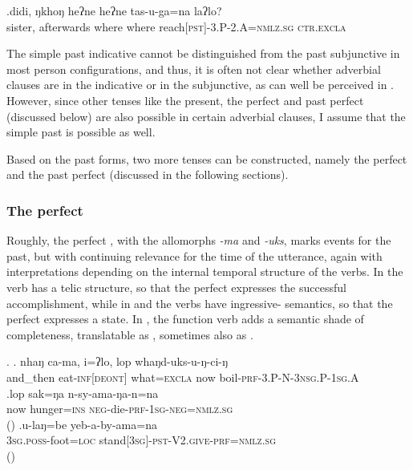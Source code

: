 \exg.didi,        ŋkhoŋ    heʔne heʔne tas-u-ga=na                    laʔlo?\\
sister, afterwards where where reach{\scshape [pst]-3.P-2.A=nmlz.sg} {\scshape ctr.excla}\\
  

The simple past indicative cannot be distinguished from the past subjunctive in most person configurations, and thus, it is often not clear whether adverbial clauses are in the indicative or in the subjunctive, as can well be perceived in \LLast. However, since other tenses like the present, the perfect and past perfect (discussed below) are also possible in certain adverbial clauses, I assume that the simple past is possible as well. 

Based on the past forms, two more tenses can be constructed, namely the perfect and the past perfect (discussed in the following sections). 

\subsubsection{The perfect}\label{prf}

Roughly, the perfect , with the allomorphs \emph{-ma} and \emph{-uks}, marks events for the past, but with continuing relevance for  the time of the utterance, again with interpretations depending on the internal temporal structure of the verbs. In \Next[a] the verb has a telic structure, so that the perfect expresses the successful accomplishment, while in \Next[b] and \Next[c] the verbs have ingressive- semantics, so that the perfect expresses a state. In \Next[c], the function verb  adds a semantic shade of completeness, translatable as , sometimes also as .

\ex. \ag. nhaŋ    ca-ma,     i=ʔlo,   lop whaŋd-uks-u-ŋ-ci-ŋ\\
		and\_then eat{\scshape -inf[deont]} what{\scshape =excla} now boil{\scshape -prf-3.P-N-3nsg.P-1sg.A}\\
		 
		\bg.lop sak=ŋa n-sy-ama-ŋa-n=na\\
now hunger{\scshape =ins} {\scshape neg-}die{\scshape -prf-1sg-neg=nmlz.sg}\\
		 ()
	\bg.u-laŋ=be yeb-a-by-ama=na\\
	{\scshape 3sg.poss-}foot{\scshape =loc} stand{\scshape [3sg]-pst-V2.give-prf=nmlz.sg}\\
	 ()
	
